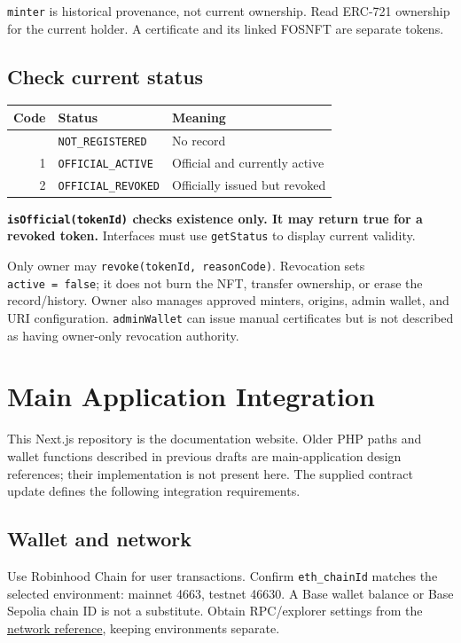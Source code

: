 \documentclass[
  10pt,
  letterpaper,
]{article}
\begin{document}
\texttt{minter} is historical provenance, not current ownership. Read
ERC-721 ownership for the current holder. A certificate and its linked
FOSNFT are separate tokens.

\subsection{Check current status}\label{check-current-status}

\begin{longtable}[]{@{}rll@{}}
\toprule\noalign{}
Code & Status & Meaning \\
\midrule\noalign{}
\endhead
\bottomrule\noalign{}
\endlastfoot
0 & \texttt{NOT\_REGISTERED} & No record \\
1 & \texttt{OFFICIAL\_ACTIVE} & Official and currently active \\
2 & \texttt{OFFICIAL\_REVOKED} & Officially issued but revoked \\
\end{longtable}

\textbf{\texttt{isOfficial(tokenId)} checks existence only. It may
return true for a revoked token.} Interfaces must use \texttt{getStatus}
to display current validity.

Only owner may \texttt{revoke(tokenId,\ reasonCode)}. Revocation sets
\texttt{active\ =\ false}; it does not burn the NFT, transfer ownership,
or erase the record/history. Owner also manages approved minters,
origins, admin wallet, and URI configuration. \texttt{adminWallet} can
issue manual certificates but is not described as having owner-only
revocation authority.

\section{Main Application
Integration}\label{main-application-integration}

This Next.js repository is the documentation website. Older PHP paths
and wallet functions described in previous drafts are main-application
design references; their implementation is not present here. The
supplied contract update defines the following integration requirements.

\subsection{Wallet and network}\label{wallet-and-network}

Use Robinhood Chain for user transactions. Confirm \texttt{eth\_chainId}
matches the selected environment: mainnet 4663, testnet 46630. A Base
wallet balance or Base Sepolia chain ID is not a substitute. Obtain
RPC/explorer settings from the
\href{https://fos.ooo/document/docs/protocol/platform}{network
reference}, keeping environments separate.
\end{document}
